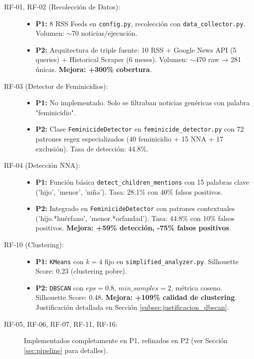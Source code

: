 \begin{description}
    \item[RF-01, RF-02 (Recolección de Datos):] 
    \begin{itemize}
        \item \textbf{P1:} 8 RSS Feeds en \texttt{config.py}, recolección con \texttt{data\_collector.py}. Volumen: $\sim$70 noticias/ejecución.
        \item \textbf{P2:} Arquitectura de triple fuente: 10 RSS + Google News API (5 queries) + Historical Scraper (6 meses). Volumen: $\sim$470 raw → 281 únicas. \textbf{Mejora: +300\% cobertura}.
    \end{itemize}
    
    \item[RF-03 (Detector de Feminicidios):] 
    \begin{itemize}
        \item \textbf{P1:} No implementado. Solo se filtraban noticias genéricas con palabra "feminicidio".
        \item \textbf{P2:} Clase \texttt{FeminicideDetector} en \texttt{feminicide\_detector.py} con 72 patrones regex especializados (40 feminicidio + 15 NNA + 17 exclusión). Tasa de detección: 44.8\%.
    \end{itemize}
    
    \item[RF-04 (Detección NNA):] 
    \begin{itemize}
        \item \textbf{P1:} Función básica \texttt{detect\_children\_mentions} con 15 palabras clave ('hijo', 'menor', 'niña'). Tasa: 28.1\% con 40\% falsos positivos.
        \item \textbf{P2:} Integrado en \texttt{FeminicideDetector} con patrones contextuales ('hijo.*huérfano', 'menor.*orfandad'). Tasa: 44.8\% con 10\% falsos positivos. \textbf{Mejora: +59\% detección, -75\% falsos positivos}.
    \end{itemize}
    
    \item[RF-10 (Clustering):] 
    \begin{itemize}
        \item \textbf{P1:} \texttt{KMeans} con $k=4$ fijo en \texttt{simplified\_analyzer.py}. Silhouette Score: 0.23 (clustering pobre).
        \item \textbf{P2:} \texttt{DBSCAN} con $eps=0.8$, $min\_samples=2$, métrica coseno. Silhouette Score: 0.48. \textbf{Mejora: +109\% calidad de clustering}. Justificación detallada en Sección \ref{subsec:justificacion_dbscan}.
    \end{itemize}
    
    \item[RF-05, RF-06, RF-07, RF-11, RF-16:] Implementados completamente en P1, refinados en P2 (ver Sección \ref{sec:pipeline} para detalles).
\end{description}

